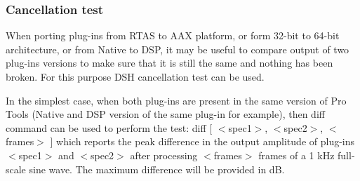\hypertarget{a00835_subsection__cancellationtest}{}\subsubsection{Cancellation test}\label{a00835_subsection__cancellationtest}
 When porting plug-\/ins from R\+T\+AS to A\+AX platform, or form 32-\/bit to 64-\/bit architecture, or from Native to D\+SP, it may be useful to compare output of two plug-\/in\textquotesingle{}s versions to make sure that it is still the same and nothing has been broken. For this purpose D\+SH cancellation test can be used.

In the simplest case, when both plug-\/ins are present in the same version of Pro Tools (Native and D\+SP version of the same plug-\/in for example), then {\ttfamily diff} command can be used to perform the test\+: {\ttfamily diff \mbox{[} $<$spec1$>$, $<$spec2$>$, $<$frames$>$ \mbox{]}} which reports the peak difference in the output amplitude of plug-\/ins $<$spec1$>$ and $<$spec2$>$ after processing $<$frames$>$ frames of a 1 k\+Hz full-\/scale sine wave. The maximum difference will be provided in dB.

